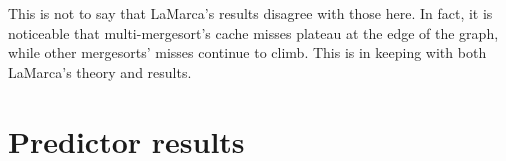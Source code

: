 This is not to say that LaMarca's results disagree with those here. In fact, it
is noticeable that multi-mergesort's cache misses plateau at the edge of the
graph, while other mergesorts' misses continue to climb. This is in keeping with
both LaMarca's theory and results.

\section{Predictor results}

